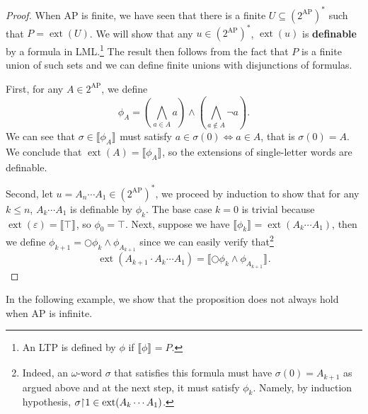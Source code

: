 \documentclass{tufte-handout} %
\theoremstyle{definition}
\theoremstyle{remark}
\newcommand{\bra}[1]{\left(#1\right)}
\newcommand{\0}{\textsf{0}}
\newcommand{\1}{\textsf{1}}
\newcommand{\AP}{\text{AP}}
\newcommand{\rest}[2]{#1 \kern-0.65ex\upharpoonright \kern-0.55ex #2}
\DeclareMathOperator{\ext}{ext}
\newcommand{\sem}[2]{\llbracket #1 \rrbracket_{#2}}
\begin{document}
\begin{proof}
When $\AP$ is finite, we have seen that there is a finite $U \subseteq (2^{\AP})^*$ such that $P = \ext(U)$. We will show that any $u \in (2^{\AP})^*$, $\ext(u)$ is \textbf{definable} by a formula in LML.\footnote{An LTP is defined by $\phi$ if $\sem{\phi}{} = P$.} The result then follows from the fact that $P$ is a finite union of such sets and we can define finite unions with disjunctions of formulas.
	
	First, for any $A \in 2^{\AP}$, we define 
	\[\phi_A = \bra{\bigwedge_{a \in A} a} \wedge \bra{\bigwedge_{a \notin A} \neg a}.\]
	We can see that $\sigma \in \sem{\phi_A}{}$ must satisfy $a \in \sigma(0) \Leftrightarrow a \in A$, that is $\sigma(0) = A$. We conclude that $\ext(A) = \sem{\phi_A}{}$, so the extensions of single-letter words are definable.
	
	Second, let $u = A_n \cdots A_1 \in (2^{\AP})^*$, we proceed by induction to show that for any $k\leq n$, $A_k\cdots A_1$ is definable by $\phi_k$. The base case $k=0$ is trivial because $\ext(\varepsilon) = \sem{\top}{}$, so $\phi_0 = \top$. Next, suppose we have $\sem{\phi_k}{} = \ext(A_k\cdots A_1)$, then we define $\phi_{k+1} = \bigcirc \phi_k \wedge \phi_{A_{k+1}}$ since we can easily verify that\footnote{Indeed, an $\omega$-word $\sigma$ that satisfies this formula must have $\sigma(0)= A_{k+1}$ as argued above and at the next step, it must satisfy $\phi_{k}$. Namely, by induction hypothesis, $\rest{\sigma}{1} \in \ext(A_k\cdots A_1)$.} \[\ext(A_{k+1} \cdot A_k \cdots A_1) = \sem{\bigcirc\phi_k \wedge \phi_{A_{k+1}}}{}.\]
\end{proof}
In the following example, we show that the proposition does not always hold when $\AP$ is infinite.
\end{document}
